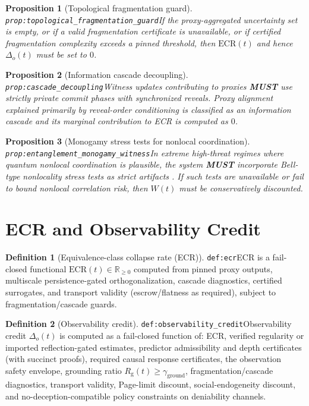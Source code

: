 \documentclass[11pt]{article}
\theoremstyle{definition}
\newtheorem{definition}{Definition}
\theoremstyle{plain}
\newtheorem{proposition}{Proposition}
\newcommand{\MUST}{\textbf{MUST}}
\newcommand{\lbl}[1]{\texttt{\footnotesize\nolinkurl{#1}}}
\newcommand{\DefLabel}[1]{\hfill{\small\lbl{#1}}}
\newcommand{\R}{\mathbb{R}}
\newcommand{\deltao}{\Delta_o}
\newcommand{\gground}{\gamma_{\mathrm{ground}}}
\newcommand{\Rg}{R_{\mathrm{g}}}
\begin{document}
\begin{proposition}[Topological fragmentation guard]\DefLabel{prop:topological_fragmentation_guard}\label{prop:topological_fragmentation_guard}
If the proxy-aggregated uncertainty set is empty, or if a valid fragmentation certificate is unavailable, or if certified fragmentation complexity exceeds a pinned threshold, then $\mathrm{ECR}(t)$ and hence $\deltao(t)$ must be set to $0$.
\end{proposition}

\begin{proposition}[Information cascade decoupling]\DefLabel{prop:cascade_decoupling}\label{prop:cascade_decoupling}
Witness updates contributing to proxies \MUST{} use strictly private commit phases with synchronized reveals.
Proxy alignment explained primarily by reveal-order conditioning is classified as an information cascade \cite{Bikhchandani1992,Banerjee1992} and its marginal contribution to ECR is computed as $0$.
\end{proposition}

\begin{proposition}[Monogamy stress tests for nonlocal coordination]\DefLabel{prop:entanglement_monogamy_witness}\label{prop:entanglement_monogamy_witness}
In extreme high-threat regimes where quantum nonlocal coordination is plausible, the system \MUST{} incorporate Bell-type nonlocality stress tests as strict artifacts \cite{Bell1964,CHSH1969}.
If such tests are unavailable or fail to bound nonlocal correlation risk, then $W(t)$ must be conservatively discounted.
\end{proposition}

\section{ECR and Observability Credit}\label{sec:ecr}
\begin{definition}[Equivalence-class collapse rate (ECR)]\DefLabel{def:ecr}\label{def:ecr}
ECR is a fail-closed functional $\mathrm{ECR}(t)\in\R_{\ge 0}$ computed from pinned proxy outputs, multiscale persistence-gated orthogonalization, cascade diagnostics, certified surrogates, and transport validity (escrow/flatness as required), subject to fragmentation/cascade guards.
\end{definition}

\begin{definition}[Observability credit]\DefLabel{def:observability_credit}\label{def:observability_credit}
Observability credit $\deltao(t)$ is computed as a fail-closed function of:
ECR, verified regularity or imported reflection-gated estimates, predictor admissibility and depth certificates (with succinct proofs), required causal response certificates, the observation safety envelope, grounding ratio $\Rg(t)\ge \gground$, fragmentation/cascade diagnostics, transport validity, Page-limit discount, social-endogeneity discount, and no-deception-compatible policy constraints on deniability channels.
\end{definition}
\end{document}
